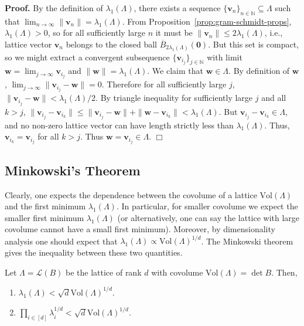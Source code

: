 \documentclass{template}
\newcommand{\qedwhite}{\hfill \ensuremath{\Box}}
\begin{document}
\textbf{Proof.} By the definition of $\lambda_1(\Lambda)$, there exists a
sequence $\{\mathbf{v}_n\}_{n \in \mathbb{N}} \subseteq \Lambda$ such that
$\lim_{n \to \infty}\|\mathbf{v}_n\| = \lambda_1(\Lambda)$. From
Proposition~\ref{prop:gram-schmidt-props}, $\lambda_1(\Lambda) > 0$, so for all
sufficiently large $n$ it must be $\|\mathbf{v}_n\| \leq 2\lambda_1(\Lambda)$,
i.e., lattice vector $\mathbf{v}_n$ belongs to the closed ball
$\overline{B}_{2\lambda_1(\Lambda)}(\mathbf{0})$. But this set is compact, so we
might extract a convergent subsequence $\{\mathbf{v}_{i_j}\}_{j \in \mathbb{N}}$
with limit $\mathbf{w} = \lim_{j \to \infty}\mathbf{v}_{i_j}$ and
$\|\mathbf{w}\| = \lambda_1(\Lambda)$. We claim that $\mathbf{w} \in \Lambda$.
By definition of $\mathbf{w}$, $\lim_{j \to \infty}\|\mathbf{v}_{i_j} -
\mathbf{w}\|=0$. Therefore for all sufficiently large $j$, $\|\mathbf{v}_{i_j} -
\mathbf{w}\| < \lambda_1(\Lambda)/2$. By triangle inequality for sufficiently
large $j$ and all $k>j$, $\|\mathbf{v}_{i_j}-\mathbf{v}_{i_k}\| \leq
\|\mathbf{v}_{i_j} - \mathbf{w}\| + \|\mathbf{w} - \mathbf{v}_{i_k}\| <
\lambda_1(\Lambda)$. But $\mathbf{v}_{i_j}-\mathbf{v}_{i_k} \in \Lambda$, and 
no non-zero lattice vector can have length strictly less than $\lambda_1(\Lambda)$.
Thus, $\mathbf{v}_{i_k}=\mathbf{v}_{i_j}$ for all $k>j$. Thus $\mathbf{w}=\mathbf{v}_{i_j} \in \Lambda$. \qedwhite

\subsection{Minkowski's Theorem}

Clearly, one expects the dependence between the covolume of a lattice
$\text{Vol}(\Lambda)$ and the first minimum $\lambda_1(\Lambda)$. In particular,
for smaller covolume we expect the smaller first minimum $\lambda_1(\Lambda)$
(or alternatively, one can say the lattice with large covolume cannot have a
small first minimum). Moreover, by dimensionality analysis one should expect
that $\lambda_1(\Lambda) \propto \text{Vol}(\Lambda)^{1/d}$. The Minkowski
theorem gives the inequality between these two quantities.

\begin{theorem}\label{theorem:minkowski}
    Let $\Lambda=\mathcal{L}(B)$ be the lattice of rank $d$ with covolume
    $\text{Vol}(\Lambda) = \det B$. Then,
    \begin{enumerate}[align=left]
        \item[\textbf{First Minkowski's Theorem}] $\lambda_1(\Lambda) < \sqrt{d}\text{Vol}(\Lambda)^{1/d}$.
        \item[\textbf{Second Minkowski's Theorem}] $\prod_{i \in [d]}\lambda_i^{1/d} < \sqrt{d}\text{Vol}(\Lambda)^{1/d}$. 
    \end{enumerate}
\end{theorem}
\end{document}
